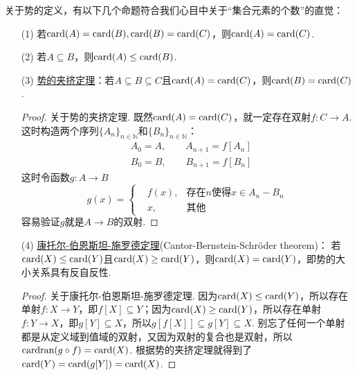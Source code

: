\documentclass[main.tex]{subfiles}
\begin{document}
关于势的定义，有以下几个命题符合我们心目中关于“集合元素的个数”的直觉：
\begin{itemize}
    \item [(1)] 若\({\rm card}(A)={\rm card}(B), {\rm card}(B)={\rm card}(C)\)，则\({\rm card}(A)={\rm card}(C)\).
    \item [(2)] 若\(A \subseteq B\)，则\({\rm card}(A) \leq {\rm card}(B)\).
    \item [(3)] \uline{势的夹挤定理}：若\(A \subseteq B \subseteq C\)且\({\rm card}(A) = {\rm card}(C)\)，则\({\rm card}(B) = {\rm card}(C)\).
        \begin{proof}
            关于势的夹挤定理. 既然\({\rm card}(A) = {\rm card}(C)\)，就一定存在双射\(f: C \to A\). 这时构造两个序列\(\{A_n\}_{n \in \mathbb{N}}\)和\(\{B_n\}_{n \in \mathbb{N}}\)：
            \begin{align*}
                & A_0 = A, \qquad A_{n+1} = f[A_n] \\
                & B_0 = B, \qquad B_{n+1} = f[B_n]
            \end{align*}
            这时令函数\(g: A \to B\)
            \[g(x) = \left\{
                \begin{aligned}
                    & f(x), &\mbox{存在}n\mbox{使得}x \in A_n - B_n \\
                    & x, &\mbox{其他}
                \end{aligned}
            \right. 
            \]
            容易验证\(g\)就是\(A \to B\)的双射.
        \end{proof}
    \item [(4)] \uline{康托尔-伯恩斯坦-施罗德定理}(Cantor-Bernstein-Schröder theorem)：
    \newline
    若\({\rm card}(X) \leq {\rm card}(Y)\)且\({\rm card}(X) \geq {\rm card}(Y)\)，则\({\rm card}(X) = {\rm card}(Y)\)，即势的大小关系具有反自反性.
    \begin{proof}
        关于康托尔-伯恩斯坦-施罗德定理. 因为\({\rm card}(X) \leq {\rm card}(Y)\)，所以存在单射\(f:X \to Y\)，即\(f[X] \subseteq Y\)；因为\({\rm card}(X) \geq {\rm card}(Y)\)，所以存在单射\(f:Y \to X\)，即\(g[Y] \subseteq X\)，所以\(g[f[X]] \subseteq g[Y] \subseteq X\). 别忘了任何一个单射都是从定义域到值域的双射，又因为双射的复合也是双射，所以\({\rm card} {\rm ran} (g \circ f) = {\rm card}(X)\). 根据势的夹挤定理就得到了\({\rm card}(Y) = {\rm card}(g[Y]) = {\rm card}(X)\).
    \end{proof}
\end{itemize}
\end{document}
